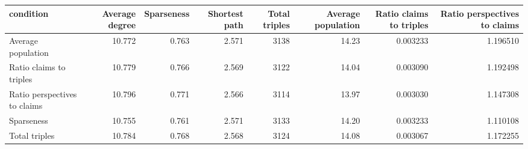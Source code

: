 \begin{tabular}{lrrrrrrr}
\toprule
                   condition &  Average degree &  Sparseness &  Shortest path &  Total triples &  Average population &  Ratio claims to triples &  Ratio perspectives to claims \\
\midrule
          Average population &          10.772 &       0.763 &          2.571 &           3138 &               14.23 &                 0.003233 &                      1.196510 \\
     Ratio claims to triples &          10.779 &       0.766 &          2.569 &           3122 &               14.04 &                 0.003090 &                      1.192498 \\
Ratio perspectives to claims &          10.796 &       0.771 &          2.566 &           3114 &               13.97 &                 0.003030 &                      1.147308 \\
                  Sparseness &          10.755 &       0.761 &          2.571 &           3133 &               14.20 &                 0.003233 &                      1.110108 \\
               Total triples &          10.784 &       0.768 &          2.568 &           3124 &               14.08 &                 0.003067 &                      1.172255 \\
\bottomrule
\end{tabular}
